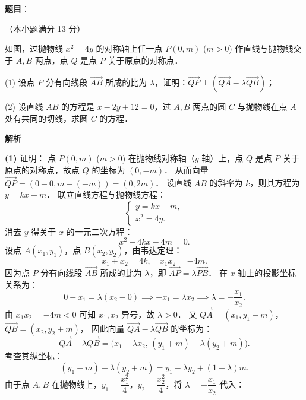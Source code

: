 \begin{answer}

\textbf{题目}：

（本小题满分 13 分）

如图，过抛物线 $x^2 = 4y$ 的对称轴上任一点 $P(0, m)$ ($m > 0$) 作直线与抛物线交于 $A, B$ 两点，点 $Q$ 是点 $P$ 关于原点的对称点．
\nopagebreak[4]
\begin{center}\end{center}
\nopagebreak[4]
(1) 设点 $P$ 分有向线段 $\vec{AB}$ 所成的比为 $\lambda$，证明：$\vec{QP} \perp (\vec{QA} - \lambda\vec{QB})$；

(2) 设直线 $AB$ 的方程是 $x - 2y + 12 = 0$，过 $A, B$ 两点的圆 $C$ 与抛物线在点 $A$ 处有共同的切线，求圆 $C$ 的方程．

\textbf{解析}
\nopagebreak[4]
\begin{center}\end{center}
\nopagebreak[4]
\textbf{(1)} 证明：
点 $P(0, m)$ ($m > 0$) 在抛物线对称轴（$y$ 轴）上，点 $Q$ 是点 $P$ 关于原点的对称点，故点 $Q$ 的坐标为 $(0, -m)$．
从而向量 $\vec{QP} = (0 - 0, m - (-m)) = (0, 2m)$．
设直线 $AB$ 的斜率为 $k$，则其方程为 $y = kx + m$．
联立直线方程与抛物线方程：
\nopagebreak[4]
\[
\begin{cases}
y = kx + m, \\
x^2 = 4y.
\end{cases}
\]
消去 $y$ 得关于 $x$ 的一元二次方程：
\nopagebreak[4]
\[
x^2 - 4kx - 4m = 0.
\]
设点 $A(x_1, y_1)$，点 $B(x_2, y_2)$，由韦达定理：
\nopagebreak[4]
\[
x_1 + x_2 = 4k, \quad x_1 x_2 = -4m.
\]
因为点 $P$ 分有向线段 $\vec{AB}$ 所成的比为 $\lambda$，即 $\vec{AP} = \lambda\vec{PB}$．
在 $x$ 轴上的投影坐标关系为：
\nopagebreak[4]
\[
0 - x_1 = \lambda(x_2 - 0) \implies -x_1 = \lambda x_2 \implies \lambda = -\frac{x_1}{x_2}.
\]
由 $x_1 x_2 = -4m < 0$ 可知 $x_1, x_2$ 异号，故 $\lambda > 0$．
又 $\vec{QA} = (x_1, y_1 + m)$，$\vec{QB} = (x_2, y_2 + m)$，
因此向量 $\vec{QA} - \lambda\vec{QB}$ 的坐标为：
\nopagebreak[4]
\[
\vec{QA} - \lambda\vec{QB} = \Big(x_1 - \lambda x_2, \, (y_1 + m) - \lambda(y_2 + m)\Big).
\]
考查其纵坐标：
\nopagebreak[4]
\[
(y_1 + m) - \lambda(y_2 + m) = y_1 - \lambda y_2 + (1 - \lambda)m.
\]
由于点 $A, B$ 在抛物线上，$y_1 = \dfrac{x_1^2}{4}$，$y_2 = \dfrac{x_2^2}{4}$，将 $\lambda = -\dfrac{x_1}{x_2}$ 代入：

\end{answer}

